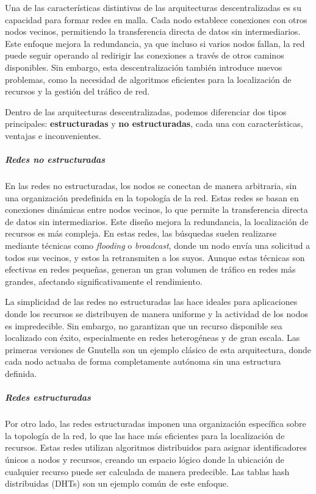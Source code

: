 Una de las características distintivas de las arquitecturas descentralizadas es su capacidad para formar redes en malla.
Cada nodo establece conexiones con otros nodos vecinos, permitiendo la transferencia directa de datos sin intermediarios.
Este enfoque mejora la redundancia, ya que incluso si varios nodos fallan, la red puede seguir operando al redirigir las conexiones a través de otros caminos disponibles.
Sin embargo, esta descentralización también introduce nuevos problemas, como la necesidad de algoritmos eficientes para la localización de recursos y la gestión del tráfico de red.

Dentro de las arquitecturas descentralizadas, podemos diferenciar dos tipos principales: \textbf{estructuradas} y \textbf{no estructuradas},
cada una con características, ventajas e inconvenientes.

\subparagraph{Redes no estructuradas}

En las redes no estructuradas, los nodos se conectan de manera arbitraria, sin una organización predefinida en la topología de la red.
Estas redes se basan en conexiones dinámicas entre nodos vecinos, lo que permite la transferencia directa de datos sin intermediarios.
Este diseño mejora la redundancia, la localización de recursos es más compleja.
En estas redes, las búsquedas suelen realizarse mediante técnicas como \textit{flooding} o \textit{broadcast},
donde un nodo envía una solicitud a todos sus vecinos, y estos la retransmiten a los suyos.
Aunque estas técnicas son efectivas en redes pequeñas, generan un gran volumen de tráfico en redes más grandes, afectando significativamente el rendimiento.

La simplicidad de las redes no estructuradas las hace ideales para aplicaciones donde los recursos se distribuyen de manera uniforme y la actividad de los nodos es impredecible.
Sin embargo, no garantizan que un recurso disponible sea localizado con éxito, especialmente en redes heterogéneas y de gran escala.
Las primeras versiones de Gnutella son un ejemplo clásico de esta arquitectura, donde cada nodo actuaba de forma completamente autónoma sin una estructura definida.

\subparagraph{Redes estructuradas}

Por otro lado, las redes estructuradas imponen una organización específica sobre la topología de la red, lo que las hace más eficientes para la localización de recursos.
Estas redes utilizan algoritmos distribuidos para asignar identificadores únicos a nodos y recursos,
creando un espacio lógico donde la ubicación de cualquier recurso puede ser calculada de manera predecible.
Las tablas hash distribuidas (DHTs) son un ejemplo común de este enfoque.


